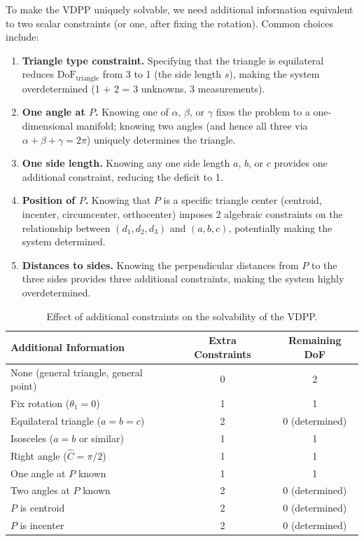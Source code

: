 To make the VDPP uniquely solvable, we need additional information equivalent to two scalar constraints (or one, after fixing the rotation). Common choices include:

\begin{enumerate}
    \item \textbf{Triangle type constraint.} Specifying that the triangle is equilateral reduces $\text{DoF}_{\text{triangle}}$ from 3 to 1 (the side length $s$), making the system overdetermined (1 + 2 = 3 unknowns, 3 measurements).

    \item \textbf{One angle at $P$.} Knowing one of $\alpha$, $\beta$, or $\gamma$ fixes the problem to a one-dimensional manifold; knowing two angles (and hence all three via $\alpha + \beta + \gamma = 2\pi$) uniquely determines the triangle.

    \item \textbf{One side length.} Knowing any one side length $a$, $b$, or $c$ provides one additional constraint, reducing the deficit to 1.

    \item \textbf{Position of $P$.} Knowing that $P$ is a specific triangle center (centroid, incenter, circumcenter, orthocenter) imposes 2 algebraic constraints on the relationship between $(d_1, d_2, d_3)$ and $(a, b, c)$, potentially making the system determined.

    \item \textbf{Distances to sides.} Knowing the perpendicular distances from $P$ to the three sides provides three additional constraints, making the system highly overdetermined.
\end{enumerate}

\begin{table}[h!]
\centering
\caption{Effect of additional constraints on the solvability of the VDPP.}
\label{tab:constraints}
\begin{tabular}{lcc}
\toprule
\textbf{Additional Information} & \textbf{Extra Constraints} & \textbf{Remaining DoF} \\
\midrule
None (general triangle, general point) & 0 & 2 \\
Fix rotation ($\theta_1 = 0$) & 1 & 1 \\
Equilateral triangle ($a = b = c$) & 2 & 0 (determined) \\
Isosceles ($a = b$ or similar) & 1 & 1 \\
Right angle ($\hat{C} = \pi/2$) & 1 & 1 \\
One angle at $P$ known & 1 & 1 \\
Two angles at $P$ known & 2 & 0 (determined) \\
$P$ is centroid & 2 & 0 (determined) \\
$P$ is incenter & 2 & 0 (determined) \\
\bottomrule
\end{tabular}
\end{table}
